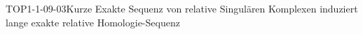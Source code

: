 
\begin{THEO}{TOP1-1-09-03}{Kurze Exakte Sequenz von relative Singulären Komplexen induziert lange exakte relative Homologie-Sequenz}
\end{THEO}
